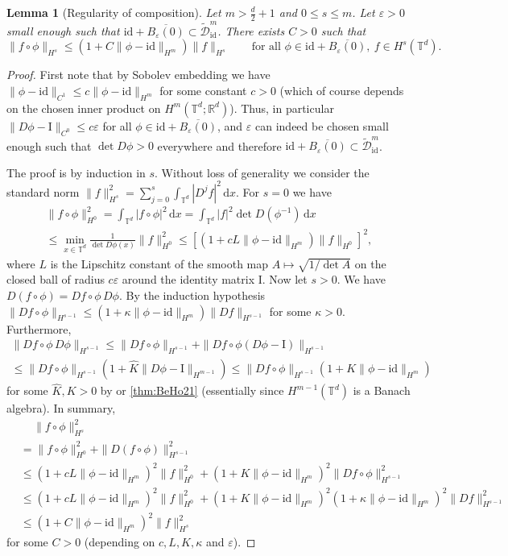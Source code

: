 \documentclass[a4paper, 12pt]{article}
\newtheorem{lemma}[theorem]{Lemma}
\newcommand{\R}{\mathbb{R}}
\newcommand{\T}{\mathbb{T}}
\renewcommand{\d}{\mathrm{d}}
\newcommand{\id}{\mathrm{id}}
\newcommand{\DiffSobIdLift}{\widetilde{\mathcal D}_{\id}}
\newcommand{\onesymbol}{\mathrm{I}}
\begin{document}
\begin{lemma}[Regularity of composition]\label{thm:Regulcomposition}
Let $m>\frac d2+1$ and $0\leq s\leq m$.
Let $\varepsilon>0$ small enough such that $\id+\overline{B_\varepsilon(0)}\subset\DiffSobIdLift^m$. There exists $C>0$ such that
\begin{equation*}
\|f\circ\phi\|_{H^s}\leq(1+C\|\phi-\id\|_{H^m})\|f\|_{H^s}
\qquad\text{for all }
\phi\in\id+\overline{B_\varepsilon(0)},\ f\in H^s(\T^d).
\end{equation*}
\end{lemma}
\begin{proof}
First note that by Sobolev embedding we have $\|\phi-\id\|_{C^1}\leq c\|\phi-\id\|_{H^m}$ for some constant $c>0$ (which of course depends on the chosen inner product on $H^m(\T^d;\R^d)$).
Thus, in particular $\|D\phi-\onesymbol\|_{C^0}\leq c\varepsilon$ for all $\phi\in\id+\overline{B_{\varepsilon}(0)}$,
and $\varepsilon$ can indeed be chosen small enough such that $\det D\phi>0$ everywhere and therefore $\id+\overline{B_{\varepsilon}(0)}\subset\DiffSobIdLift^m$.

The proof is by induction in $s$.
Without loss of generality we consider the standard norm $\|f\|_{H^s}^2=\sum_{j=0}^s\int_{\T^d}|D^jf|^2\,\d x$.
For $s=0$ we have
\begin{multline*}
\|f\circ\phi\|_{H^0}^2
=\int_{\T^d}|f\circ\phi|^2\,\d x
=\int_{\T^d}|f|^2\det D(\phi^{-1})\,\d x\\
\leq\min_{x\in\T^d}\frac1{\det D\phi(x)}\|f\|_{H^0}^2
\leq[(1+cL\|\phi-\id\|_{H^m})\|f\|_{H^0}]^2,
\end{multline*}
where $L$ is the Lipschitz constant of the smooth map $A\mapsto\sqrt{1/\det A}$ on the closed ball of radius $c\varepsilon$ around the identity matrix $\onesymbol$.
Now let $s>0$.
We have $D(f\circ\phi)=Df\circ\phi\, D\phi$.
By the induction hypothesis $\|Df\circ\phi\|_{H^{s-1}}\leq(1+\kappa\|\phi-\id\|_{H^m})\|Df\|_{H^{s-1}}$ for some $\kappa>0$.
Furthermore,
\begin{multline*}
\|Df\circ\phi\, D\phi\|_{H^{s-1}}
\leq\|Df\circ\phi\|_{H^{s-1}}+\|Df\circ\phi(D\phi-\onesymbol)\|_{H^{s-1}}\\
\leq\|Df\circ\phi\|_{H^{s-1}}(1+\hat K\|D\phi-\onesymbol\|_{H^{m-1}})
\leq\|Df\circ\phi\|_{H^{s-1}}(1+K\|\phi-\id\|_{H^m})
\end{multline*}
for some $\hat K,K>0$ by \cite[Lemma 2.3]{InKaTo13} or \cref{thm:BeHo21} (essentially since $H^{m-1}(\T^d)$ is a Banach algebra).
In summary,
\begin{align*}
&\,\quad\|f\circ\phi\|_{H^s}^2\\
&=\|f\circ\phi\|_{H^0}^2+\|D(f\circ\phi)\|_{H^{s-1}}^2\\
&\leq(1+cL\|\phi-\id\|_{H^m})^2\|f\|_{H^0}^2+(1+K\|\phi-\id\|_{H^m})^2\|Df\circ\phi\|_{H^{s-1}}^2\\
&\leq(\!1\!+\!cL\|\phi\!-\!\id\|_{H^m}\!)^2\|f\|_{H^0}^2\!+\!(\!1\!+\!K\|\phi\!-\!\id\|_{H^m}\!)^2(\!1\!+\!\kappa\|\phi\!-\!\id\|_{H^m}\!)^2\|Df\|_{H^{s\!-\!1}}^2\\
&\leq(1+C\|\phi-\id\|_{H^m})^2\|f\|_{H^s}^2
\end{align*}
for some $C>0$ (depending on $c,L,K,\kappa$ and $\varepsilon$).
\end{proof}
\end{document}
